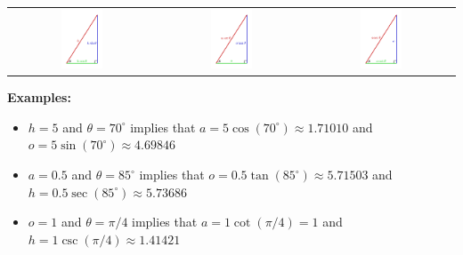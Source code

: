 \documentclass{article}
\begin{document}
\begin{tabular}{ccc}
\parbox{0.3\textwidth}{
\includegraphics[width = 0.3\textwidth]{right_triangle_h}
} & \parbox{0.3\textwidth}{
\includegraphics[width = 0.3\textwidth]{right_triangle_a}
} & \parbox{0.3\textwidth}{
\includegraphics[width = 0.3\textwidth]{right_triangle_o}
}
\end{tabular}

\textbf{Examples:}
\begin{itemize}
\item \(h = 5\) and \(\theta = 70^\circ\) implies that \(a = 5\cos(70^\circ) \approx 1.71010\) and \(o = 5\sin(70^\circ) \approx 4.69846\) 
\item \(a = 0.5\) and \(\theta = 85^\circ\) implies that \(o = 0.5\tan(85^\circ) \approx 5.71503\) and \(h = 0.5\sec(85^\circ) \approx 5.73686\)
\item \(o = 1\) and \(\theta = \pi/4\) implies that \(a = 1\cot(\pi/4) = 1\) and \(h = 1\csc(\pi/4) \approx 1.41421\)
\end{itemize}
\end{document}
